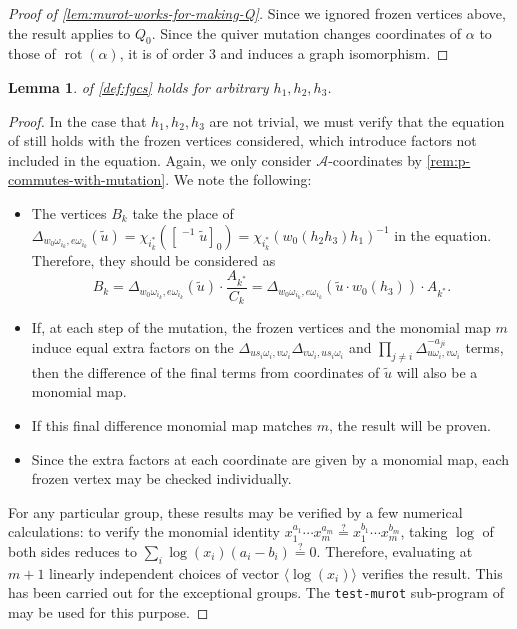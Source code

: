\documentclass{amsart}
\theoremstyle{plain}
\newtheorem{lemma}[theorem]{Lemma}
\theoremstyle{definition}
\theoremstyle{remark}
\newcommand{\fundamentalweight}{\omega}
\newcommand{\genminoryz}[3]{\Delta_{{#1} \fundamentalweight_{#3}, {#2}%
    \fundamentalweight_{#3}}}
\newcommand{\lifttoG}[1]{{\mathop{\overline{#1}}}}
\newcommand{\monomialmap}{m}
\begin{document}
  \begin{proof}[Proof of \cref{lem:murot-works-for-making-Q}]
    Since we ignored frozen vertices above, the result applies to $Q_0$.
    Since the quiver mutation changes coordinates of $\alpha$ to those
    of $\operatorname{rot}(\alpha)$, it is of order 3 and induces a
    graph isomorphism.
  \end{proof}

  \begin{lemma}
    \label{lem:fgcs-exists-rot-works-nontrivial}
     of \cref{def:fgcs} holds for arbitrary
    $h_1, h_2, h_3$.
  \end{lemma}
  \begin{proof}
    In the case that $h_1, h_2, h_3$ are not trivial, we must verify
    that the equation of \cite[Theorem~1.17]{fominzelevinsky1999} still
    holds with the frozen vertices considered, which introduce factors
    not included in the equation. Again, we only consider
    $\mathcal{A}$-coordinates by \cref{rem:p-commutes-with-mutation}. We
    note the following:

    \begin{itemize}
    \item
      The vertices $B_k$ take the place of
      $\genminoryz{w_0}{e}{i_k}(\widetilde{u}) =
      \chi_{i_k^{\ast}}([\lifttoG{w_0}^{-1} \widetilde{u}]_{0}) =
      \chi_{i_k^{\ast}}(w_0(h_2 h_3) h_1)^{-1}$ in the equation.
      Therefore, they should be considered as \[ B_k =
        \genminoryz{w_0}{e}{i_k}(\widetilde{u}) \cdot
        \frac{A_{k^{\ast}}}{C_k} =
        \genminoryz{w_0}{e}{i_k}(\widetilde{u} \cdot w_0(h_3)) \cdot
        A_{k^{\ast}}. \]
    \item
      If, at each step of the mutation, the frozen vertices and the
      monomial map $\monomialmap$ induce equal extra factors on the
      $\genminoryz{u s_i}{v}{i} \genminoryz{v}{u s_i}{i}$ and $\prod_{j
        \ne i} \genminoryz{u}{v}{i}^{-a_{ji}}$ terms, then the
      difference of the final terms from coordinates of $\widetilde{u}$
      will also be a monomial map.
    \item
      If this final difference monomial map matches $\monomialmap$, the
      result will be proven.
    \item
      Since the extra factors at each coordinate are given by a monomial
      map, each frozen vertex may be checked individually.
    \end{itemize}

    For any particular group, these results may be verified by a few
    numerical calculations: to verify the monomial identity $x_1^{a_1}
    \dotsb x_m^{a_m} \stackrel{?}{=} x_1^{b_1} \dotsb x_m^{b_m}$, taking
    $\log$ of both sides reduces to $\sum_{i} \log(x_i) (a_i - b_i)
    \stackrel{?}{=} 0$. Therefore, evaluating at $m+1$ linearly
    independent choices of vector $\langle\log(x_i)\rangle$ verifies the
    result. This has been carried out for the exceptional groups. The
    \texttt{test-murot} sub-program of \cite{gilles2020sw} may be used
    for this purpose.


\end{proof}
\end{document}

